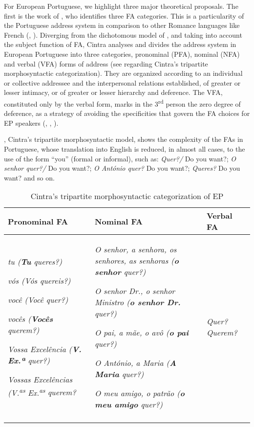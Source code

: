 \documentclass[output=paper]{langscibook}
\begin{document}
For European Portuguese, we highlight three major theoretical proposals. The first is the work of \citet{Cintra1972}, who identifies three FA categories. This is a particularity of the Portuguese address system in comparison to other Romance languages like French (\citealt{NascimentoMendesDuarte2018}, \citealt{DuarteMarquesForthcoming}). Diverging from the dichotomous model of \citet{BrownGilman1960}, and taking into account the subject function of FA, Cintra analyses and divides the address system in European Portuguese into three categories, pronominal (PFA), nominal (NFA) and verbal (VFA) forms of address (see  regarding Cintra’s tripartite morphosyntactic categorization). They are organized according to an individual or collective addressee and the interpersonal relations established, of greater or lesser intimacy, or of greater or lesser hierarchy and deference. The VFA, constituted only by the verbal form, marks in the 3\textsuperscript{rd} person the zero degree of deference, as a strategy of avoiding the specificities that govern the FA choices for EP speakers (\citealt{Carreira1997}, \citealt{Hammermüller2004}, \citealt{DuarteMarquesForthcoming}). 



, Cintra’s tripartite morphosyntactic model, shows the complexity of the FAs in Portuguese, whose translation into English is reduced, in almost all cases, to the use of the form “you” (formal or informal), such as: \textit{Quer?/} Do you want?; \textit{O senhor quer?/} Do you want?; \textit{O António quer?} Do you want?; \textit{Queres?} Do you want? and so on.


\begin{table}
\begin{tabularx}{\textwidth}{XXX}

\lsptoprule

{ Pronominal FA} & { Nominal FA} & { Verbal FA}\\
\midrule
{\textit{tu (\textbf{Tu} queres?)}}

{\textit{vós (Vós quereis?)}}

{\textit{você (Você quer?)}}

{\textit{vocês (\textbf{Vocês} querem?)}}

{\textit{Vossa Excelência (\textbf{V. Ex.ª} quer?)}}

{\textit{Vossas Excelências (V.\textsuperscript{as}} \textit{Ex.\textsuperscript{as}} \textit{querem?}} & {\textit{O senhor, a senhora, os senhores, as senhoras (\textbf{o senhor} quer?)}}

{\textit{O senhor Dr., o senhor Ministro (\textbf{o senhor Dr.} quer?)}}

{\textit{O pai, a mãe, o avô (\textbf{o pai} quer?)}}

{\textit{O António, a Maria (\textbf{A Maria} quer?)}}

{\textit{O meu amigo, o patrão (\textbf{o meu amigo} quer?)}} & { \textit{Quer? Querem?}}\\
\lspbottomrule
\end{tabularx}
\caption{Cintra’s tripartite morphosyntactic categorization of EP \citep[11-12]{Cintra1972}}
\label{tab:marques:1}
\end{table}
\end{document}
